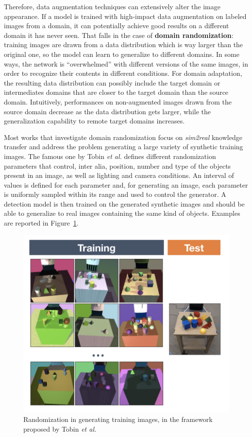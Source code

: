 \documentclass[%
    corpo=12pt,
    twoside,
    stile=classica,   
    tipotesi=magistrale,
    evenboxes,
    english,
	numerazioneromana,
]{toptesi}
\newcommand{\quotes}[1]{``#1''}
\begin{document}
Therefore, data augmentation techniques can extensively alter the image appearance. If a model is trained with high-impact data augmentation on labeled images from a domain, it can potentially achieve good results on a different domain it has never seen. That falls in the case of \textbf{domain randomization}: training images are drawn from a data distribution which is way larger than the original one, so the model can learn to generalize to different domains. In some ways, the network is \quotes{overwhelmed} with different versions of the same images, in order to recognize their contents in different conditions. For domain adaptation, the resulting data distribution can possibly include the target domain or intermediates domains that are closer to the target domain than the source domain. Intuitively, performances on non-augmented images drawn from the source domain decrease as the data distribution gets larger, while the generalization capability to remote target domains increases.

\bigskip
Most works that investigate domain randomization focus on \textit{sim2real} knowledge transfer and address the problem generating a large variety of synthetic training images. The famous one by Tobin \textit{et al.}\cite{tobin2017domain} defines different randomization parameters that control, inter alia, position, number and type of the objects present in an image, as well as lighting and camera conditions. An interval of values is defined for each parameter and, for generating an image, each parameter is uniformly sampled within its range and used to control the generator. A detection model is then trained on the generated synthetic images and should be able to generalize to real images containing the same kind of objects. Examples are reported in Figure~\ref{fig:randomization}.

\begin{figure}[ht!]
	\centering
	\includegraphics[width=0.7\linewidth]{imgs/randomization.png}
	\caption{Randomization in generating training images, in the framework proposed by Tobin \textit{et al.}\cite{tobin2017domain}}
	\label{fig:randomization}
\end{figure}
\end{document}
